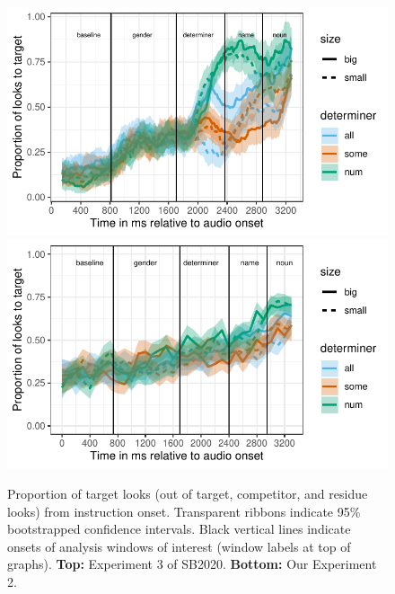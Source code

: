 \documentclass[10pt,letterpaper]{article}
\newcommand{\expref}[1]{Experiment #1}
\begin{document}
\begin{figure}[tbh!]
\centering
\includegraphics[width=\columnwidth]{../../analysis/SunBreheny/1_incremental/main/graphs/proportions_condsize_withresidue_target}
\includegraphics[width=\columnwidth]{../../analysis/SunBreheny/2_webgazer/main/graphs/proportions_condsize_withresidue_target}
\caption{Proportion of target looks (out of target, competitor, and residue looks) from instruction onset. Transparent ribbons indicate 95\% bootstrapped confidence intervals. Black vertical lines indicate onsets of analysis windows of interest (window labels at top of graphs). \textbf{Top:} \expref{3} of SB2020. \textbf{Bottom:} Our \expref{2}.}
\label{fig:results-original}
\end{figure}
\end{document}
